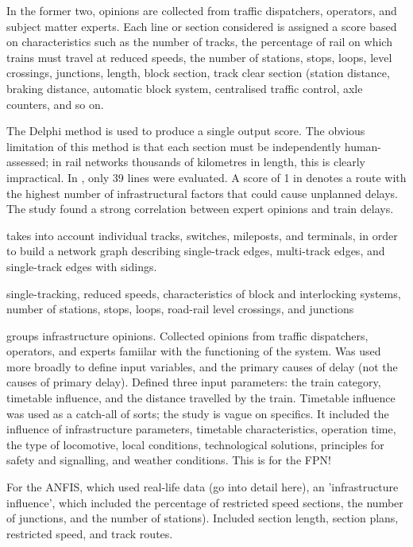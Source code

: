 \documentclass{article}
\begin{document}
In the former two, opinions are collected from traffic dispatchers, operators, and subject matter experts. Each line or section considered is assigned a score based on characteristics such as the number of tracks, the percentage of rail on which trains must travel at reduced speeds, the number of stations, stops, loops, level crossings, junctions, length, block section, track clear section (station distance, braking distance, automatic block system, centralised traffic control, axle counters, and so on. 

The Delphi method is used to produce a single output score. The obvious limitation of this method is that each section must be independently human-assessed; in rail networks thousands of kilometres in length, this is clearly impractical.  In \cite{markovic_et_al_2015}, only 39 lines were evaluated. A score of 1 in denotes a route with the highest number of infrastructural factors that could cause unplanned delays. The study found a strong correlation between expert opinions and train delays. 

\cite{barbour_et_al_2018} takes into account individual tracks, switches, mileposts, and terminals, in order to build a network graph describing single-track edges, multi-track edges, and single-track edges with sidings. 



 single-tracking, reduced speeds, characteristics of block and interlocking systems, number of stations, stops, loops, road-rail level crossings, and junctions


\cite{milinkovic_et_al_2013} groups infrastructure opinions. Collected opinions from traffic dispatchers, operators, and experts famiilar with the functioning of the system. Was used more broadly to define input variables, and the primary causes of delay (not the causes of primary delay). Defined three input parameters: the train category, timetable influence, and the distance travelled by the train. Timetable influence was used as a catch-all of sorts; the study is vague on specifics. It included the influence of infrastructure parameters, timetable characteristics, operation time, the type of locomotive, local conditions, technological solutions, principles for safety and signalling, and weather conditions. This is for the FPN!

For the ANFIS, which used real-life data (go into detail here), an 'infrastructure influence', which included the percentage of restricted speed sections, the number of junctions, and the number of stations). Included section length, section plans, restricted speed, and track routes. 
\end{document}
